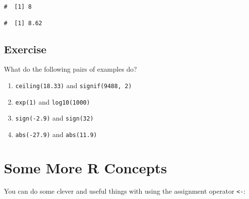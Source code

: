 \documentclass[a4paper,9pt,twocolumn,twoside,printwatermark=false]{pinp}
\providecommand{\tightlist}{%
  \setlength{\itemsep}{0pt}\setlength{\parskip}{0pt}}
\begin{document}
\begin{ShadedResult}
\begin{verbatim}
#  [1] 8
\end{verbatim}
\end{ShadedResult}

\begin{Shaded}
\begin{Highlighting}[]
\NormalTok{(}\NormalTok{, }\NormalTok{)}
\end{Highlighting}
\end{Shaded}

\begin{ShadedResult}
\begin{verbatim}
#  [1] 8.62
\end{verbatim}
\end{ShadedResult}

\subsection{Exercise}\label{exercise-1}

What do the following pairs of examples do?

\begin{enumerate}
\def\labelenumi{\arabic{enumi}.}
\tightlist
\item
  \texttt{ceiling(18.33)} and \texttt{signif(9488,\ 2)}
\item
  \texttt{exp(1)} and \texttt{log10(1000)}
\item
  \texttt{sign(-2.9)} and \texttt{sign(32)}
\item
  \texttt{abs(-27.9)} and \texttt{abs(11.9)}
\end{enumerate}

\section{Some More R Concepts}\label{some-more-r-concepts}

You can do some clever and useful things with using the assignment
operator \texttt{\textless{}-}:

\begin{Shaded}
\begin{Highlighting}[]
\StringTok{ }
\StringTok{ }
\StringTok{ }\OperatorTok{*}\StringTok{ }
\end{Highlighting}
\end{Shaded}
\end{document}
